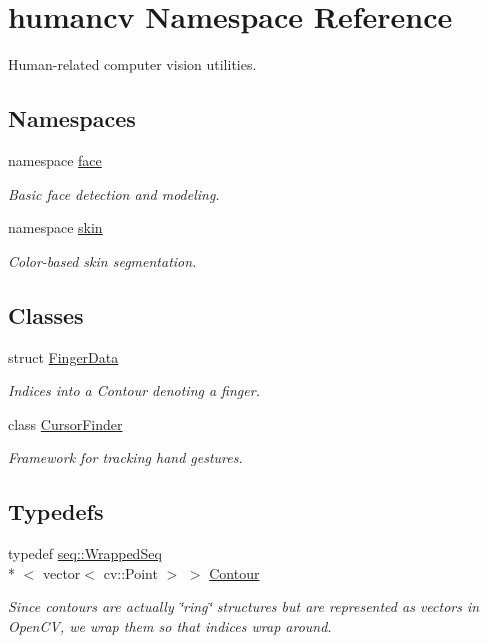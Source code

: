 \hypertarget{namespacehumancv}{\section{humancv Namespace Reference}
\label{namespacehumancv}
}


Human-\/related computer vision utilities.  


\subsection*{Namespaces}
\begin{DoxyCompactItemize}
\item 
namespace \hyperlink{namespacehumancv_1_1face}{face}
\begin{DoxyCompactList}\small\item\em Basic face detection and modeling. \end{DoxyCompactList}\item 
namespace \hyperlink{namespacehumancv_1_1skin}{skin}
\begin{DoxyCompactList}\small\item\em Color-\/based skin segmentation. \end{DoxyCompactList}\end{DoxyCompactItemize}
\subsection*{Classes}
\begin{DoxyCompactItemize}
\item 
struct \hyperlink{structhumancv_1_1_finger_data}{Finger\-Data}
\begin{DoxyCompactList}\small\item\em Indices into a {\ttfamily Contour} denoting a finger. \end{DoxyCompactList}\item 
class \hyperlink{classhumancv_1_1_cursor_finder}{Cursor\-Finder}
\begin{DoxyCompactList}\small\item\em Framework for tracking hand gestures. \end{DoxyCompactList}\end{DoxyCompactItemize}
\subsection*{Typedefs}
\begin{DoxyCompactItemize}
\item 
typedef \hyperlink{structseq_1_1_wrapped_seq}{seq\-::\-Wrapped\-Seq}\\*
$<$ vector$<$ cv\-::\-Point $>$ $>$ \hyperlink{namespacehumancv_ac3621cda88df26d2718f6bd5ec4de1dd}{Contour}
\begin{DoxyCompactList}\small\item\em Since contours are actually \char`\"{}ring\char`\"{} structures but are represented as {\ttfamily vector}s in Open\-C\-V, we wrap them so that indices wrap around. \end{DoxyCompactList}\end{DoxyCompactItemize}
